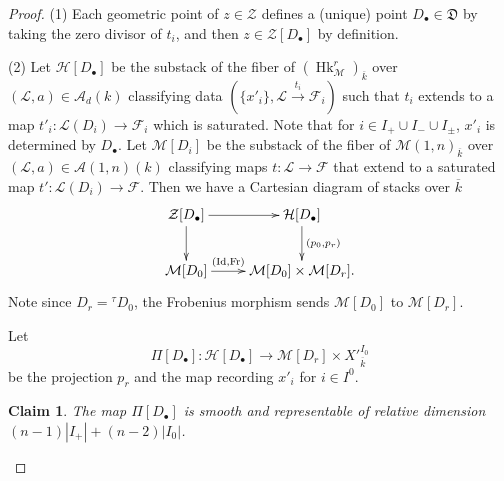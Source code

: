 \documentclass[reqno]{amsart}
\numberwithin{equation}{section}
\newcommand{\ol}[1]{\overline{#1}}
\DeclareMathOperator{\Frob}{Fr}
\DeclareMathOperator{\Id}{Id}
\DeclareMathOperator{\Hk}{Hk}
\newcommand{\bu}{\bullet}
\newcommand{\ov}{\overline}
\newcommand\xr{\xrightarrow}
\renewcommand{\t}{\tau}
\newcommand\cA{\mathcal{A}}
\newcommand\cF{\mathcal{F}}
\newcommand\cH{\mathcal{H}}
\newcommand\cL{\mathcal{L}}
\newcommand\cM{\mathcal{M}}
\newcommand\cZ{\mathcal{Z}}
\newcommand\frD{\mathfrak{D}}
\newtheorem{claim}[thm]{Claim}
\theoremstyle{remark}
\numberwithin{equation}{section}
\begin{document}
\begin{proof}
(1) Each geometric point of $z\in \cZ$ defines a (unique) point $D_{\bu}\in \frD$ by taking the zero divisor of $t_{i}$, and then $z\in \cZ[D_{\bu}]$ by definition. 

(2) Let $\cH[D_{\bu}]$ be the substack of the fiber of $(\Hk^{r}_{\cM})_{\ol{k}}$ over $(\cL,a)\in \cA_{d}(k)$ classifying data $(\{x'_{i}\},\cL\xr{t_{i}}\cF_{i})$ such that $t_{i}$ extends to a map $t'_{i}: \cL(D_{i})\to \cF_{i}$ which is saturated. Note that  for $i\in I_{+}\cup I_{-}\cup I_{\pm}$, $x'_{i}$ is determined by $D_{\bu}$. Let $\cM[D_{i}]$ be the substack of the fiber of $\cM(1,n)_{\ol{k}}$ over $(\cL,a)\in \cA(1,n)(k)$ classifying maps $t:\cL\to \cF$ that extend to a saturated map $t': \cL(D_{i})\to \cF$. Then we have a Cartesian diagram of stacks over $\ol{k}$
\begin{equation}\label{ZHM}
\xymatrix{\cZ[D_{\bu}]\ar[d]\ar[r] & \cH[D_{\bu}]\ar[d]^{(p_{0}, p_{r})}\\
\cM[D_{0}]\ar[r]^-{(\Id,\Frob)} & \cM[D_{0}]\times \cM[D_{r}].}
\end{equation}
Note since $D_{r}={}^{\t}D_{0}$, the Frobenius morphism sends $\cM[D_{0}]$ to $\cM[D_{r}]$. 

Let 
\begin{equation}
\Pi[D_{\bu}]: \cH[D_{\bu}]\to \cM[D_{r}]\times X'^{I_{0}}_{\ov k}
\end{equation}
be the projection $p_{r}$ and the map recording $x'_{i}$ for $i\in I^{0}$. 

\begin{claim} The map $\Pi[D_{\bu}]$ is smooth and representable of relative dimension $(n-1)|I_{+}|+(n-2)|I_{0}|$.
\end{claim}


\end{proof}
\end{document}
